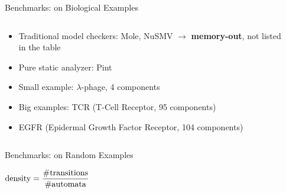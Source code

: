 \documentclass[8pt]{beamer}
\newcommand{\highlight}[1]{\textcolor{blue!50}{\textbf{#1}}}
\begin{document}
\begin{frame}{Benchmarks: on Biological Examples}
\begin{columns}
\begin{column}{0.4\textwidth}
\begin{itemize}
\item Traditional model checkers: Mole, NuSMV $\to$ \highlight{memory-out}, not listed in the table
\item Pure static analyzer: Pint~\cite{folschette2015}
\end{itemize}

\vspace{0.3cm}
\begin{itemize}
\item Small example: $\lambda$-phage, 4 components
\item Big examples: TCR (T-Cell Receptor, 95 components)
\item EGFR (Epidermal Growth Factor Receptor, 104 components)
\end{itemize}
\end{column}
\begin{column}{0.6\textwidth}
\small
    \centering
    
\end{column}
\end{columns}



\end{frame}

\begin{frame}{Benchmarks: on Random Examples}


\begin{flushright}
$\rm{density}=\dfrac{\#\rm{transitions}}{\#\rm{automata}}$
\end{flushright}

\end{frame}
\end{document}
